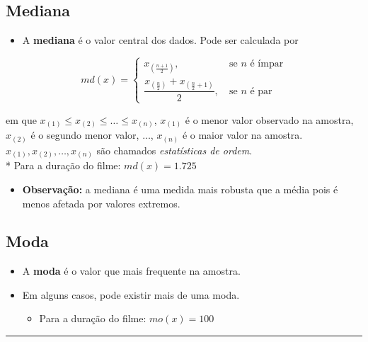 \documentclass[
]{book}
\providecommand{\tightlist}{%
  \setlength{\itemsep}{0pt}\setlength{\parskip}{0pt}}
\begin{document}
\subsection{Mediana}\label{mediana}

\begin{itemize}
\tightlist
\item
  A \textbf{mediana} é o valor central dos dados. Pode ser calculada por
\end{itemize}

\[
\displaystyle md(x) = 
\left\{
  \begin{array}{ll}
    x_{\left(\frac{n+1}{2}\right)} ,&  ~\text{se } n \text{ é ímpar} \\ 
    \dfrac{x_{\left(\frac{n}{2}\right)}+x_{\left(\frac{n}{2}+1\right)}}{2} ,&  ~\text{se } n \text{ é par}
  \end{array}
\right.
\]

em que \(x_{(1)}\leq x_{(2)}\leq \ldots \leq x_{(n)}\), \(x_{(1)}\) é o menor valor observado na amostra, \(x_{(2)}\) é o segundo menor valor, \(\ldots\), \(x_{(n)}\) é o maior valor na amostra. \(x_{(1)}, x_{(2)}, \ldots, x_{(n)}\) são chamados \emph{estatísticas de ordem}.\\
* Para a duração do filme: \(md(x) = 1.725\)

\begin{itemize}
\tightlist
\item
  \textbf{Observação:} a mediana é uma medida mais robusta que a média pois é menos afetada por valores extremos.
\end{itemize}

\subsection{Moda}\label{moda}

\begin{itemize}
\tightlist
\item
  A \textbf{moda} é o valor que mais frequente na amostra.\\
\item
  Em alguns casos, pode existir mais de uma moda.

  \begin{itemize}
  \tightlist
  \item
    Para a duração do filme: \(mo(x) = 100\)
  \end{itemize}
\end{itemize}

\begin{center}\rule{0.5\linewidth}{0.5pt}\end{center}
\end{document}
